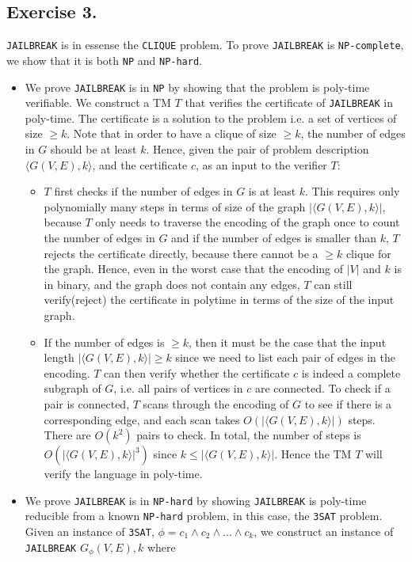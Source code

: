 \documentclass[12pt]{article}
\newcommand{\code}{\texttt}
\begin{document}
\subsection*{Exercise 3.} \code{JAILBREAK} is in essense the \code{CLIQUE} problem.
To prove \code{JAILBREAK} is \code{NP-complete}, we show that it is both \code{NP} and \code{NP-hard}.
\begin{itemize}
  \item We prove \code{JAILBREAK} is in \code{NP} by showing that the problem is poly-time verifiable. We construct a TM \(T\) that verifies the certificate of \code{JAILBREAK} in poly-time. The certificate is a solution to the problem i.e. a set of vertices of size \(\geq k\). Note that in order to have a clique of size \(\geq k\), the number of edges in \(G\) should be at least \(k\). Hence,
  given the pair of problem description \(\langle G(V,E),k \rangle\), and the certificate \(c\), as an input to the verifier \(T\):
  \begin{itemize}
    \item  \(T\) first checks if the number of edges in \(G\) is at least \(k\). This requires only polynomially many steps in terms of size of the graph \(|\langle G(V,E),k \rangle|\), because \(T\) only needs to traverse the encoding of the graph once to count the number of edges in \(G\) and if the number of edges is smaller than \(k\), \(T\) rejects the certificate directly, because there cannot be a \(\geq k\) clique for the graph. Hence, even in the worst case that the encoding of \(|V|\) and \(k\) is in binary, and the graph does not contain any edges, \(T\) can still verify(reject) the certificate in polytime in terms of the size of the input graph.
    \item If the number of edges is \(\geq k\), then it must be the case that the input length \(|\langle G(V,E),k \rangle| \geq k\) since we need to list each pair of edges in the encoding. \(T\) can then verify whether the certificate \(c\) is indeed a complete subgraph of \(G\), i.e. all pairs of vertices in \(c\) are connected. To check if a pair is connected, \(T\) scans through the encoding of \(G\) to see if there is a corresponding edge, and each scan takes \(O(|\langle G(V,E),k \rangle|)\) steps. There are \(O(k^2)\) pairs to check. In total, the number of steps is \(O(|\langle G(V,E),k \rangle|^3)\) since \(k \leq |\langle G(V,E),k \rangle|\). Hence the TM \(T\) will verify the language in poly-time.
  \end{itemize}
  \item We prove \code{JAILBREAK} is in \code{NP-hard} by showing \code{JAILBREAK} is poly-time reducible from a known \code{NP-hard} problem, in this case, the \code{3SAT} problem. Given an instance of \code{3SAT}, \(\phi = c_1 \land c_2 \land ... \land c_k\), we construct an instance of \code{JAILBREAK} \(G_\phi(V,E),k\) where

\end{itemize}
\end{document}
